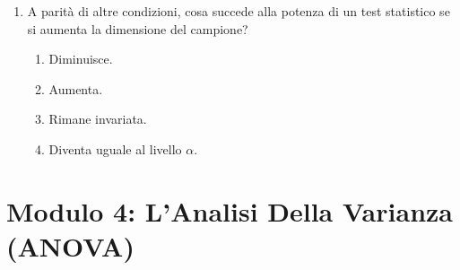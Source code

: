 \documentclass[12pt, a4paper]{article}
\begin{document}
\begin{enumerate}[resume]
    \item A parità di altre condizioni, cosa succede alla potenza di un test statistico se si aumenta la dimensione del campione?
    \begin{enumerate}
        \item Diminuisce.
        \item Aumenta.
        \item Rimane invariata.
        \item Diventa uguale al livello $\alpha$.
    \end{enumerate}
    \vspace{0.3cm}
\end{enumerate}

\section*{Modulo 4: L'Analisi Della Varianza (ANOVA)}
\end{document}
